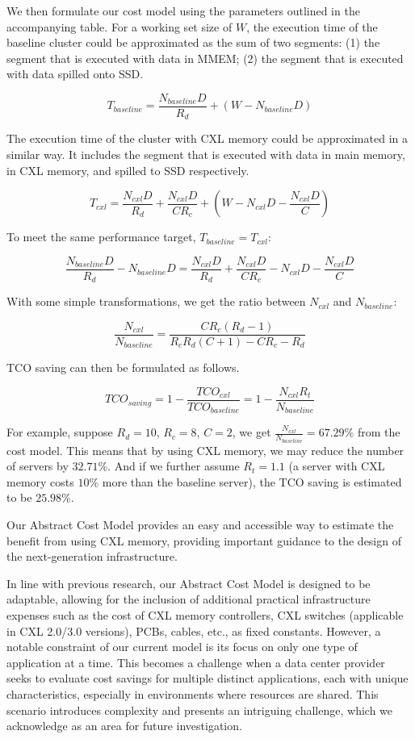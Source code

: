 We then formulate our cost model using the parameters outlined in the accompanying table. For a working set size of $W$, the execution time of the baseline cluster could be approximated as the sum of two segments: (1) the segment that is executed with data in MMEM; (2) the segment that is executed with data spilled onto SSD.

$$
T_{baseline} = \frac{N_{baseline} D}{R_d} + (W - N_{baseline}D)
$$

The execution time of the cluster with CXL memory could be approximated in a similar way. It includes the segment that is executed with data in main memory, in CXL memory, and spilled to SSD respectively.

$$ T_{cxl} = \frac{N_{cxl} D}{R_d} + \frac{N_{cxl} D}{CR_c} + (W - N_{cxl} D - \frac{N_{cxl} D}{C}) $$

To meet the same performance target, $T_{baseline} = T_{cxl}$:

$$
\frac{N_{baseline} D}{R_d} - N_{baseline} D = \frac{N_{cxl} D}{R_d} + \frac{N_{cxl} D}{CR_c} - N_{cxl} D - \frac{N_{cxl} D }{C}
$$

With some simple transformations, we get the ratio between $N_{cxl}$ and $N_{baseline}$: 

$$ \frac{N_{cxl}}{N_{baseline}} = \frac{CR_c(R_d - 1)}{R_cR_d(C+1) - C R_c - R_d} $$

TCO saving can then be formulated as follows.

$$
TCO_{saving}=1-\frac{TCO_{cxl}}{TCO_{baseline}}=1-\frac{N_{cxl} R_t}{N_{baseline}}
$$

For example, suppose $ R_d = 10 $, $R_c = 8 $, $ C = 2 $, we get $\frac{N_{cxl}}{N_{baseline}} = 67.29\%$ from the cost model. This means that by using CXL memory, we may reduce the number of servers by $32.71\%$. And if we further assume $R_t=1.1$ (a server with CXL memory costs $10\%$ more than the baseline server), the TCO saving is estimated to be $25.98\%$.

Our Abstract Cost Model provides an easy and accessible way to estimate the benefit from using CXL memory, providing important guidance to the design of the next-generation infrastructure.

In line with previous research, our Abstract Cost Model is designed to be adaptable, allowing for the inclusion of additional practical infrastructure expenses such as the cost of CXL memory controllers, CXL switches (applicable in CXL 2.0/3.0 versions), PCBs, cables, etc., as fixed constants. However, a notable constraint of our current model is its focus on only one type of application at a time. This becomes a challenge when a data center provider seeks to evaluate cost savings for multiple distinct applications, each with unique characteristics, especially in environments where resources are shared. This scenario introduces complexity and presents an intriguing challenge, which we acknowledge as an area for future investigation.










